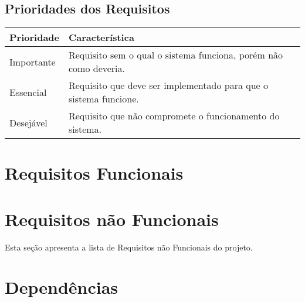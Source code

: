 \documentclass{article}
\begin{document}
	\subsection{Prioridades dos Requisitos}
	\FloatBarrier
	\begin{table}[H]
		\begin{center}
			\begin{tabular}[pos]{|m{2cm} | m{12cm}|} \hline
			\cellcolor[gray]{0.9}\textbf{Prioridade} & \cellcolor[gray]{0.9}\textbf{Característica} \\ \hline
			Importante      & Requisito sem o qual o sistema funciona, porém não como deveria.  \\ \hline
			Essencial       & Requisito que deve ser implementado para que o sistema funcione.  \\ \hline
			Desejável       & Requisito que não compromete o funcionamento do sistema.  \\ \hline
			\end{tabular}
		\end{center}
	\end{table}  
		
\section{Requisitos Funcionais}
		
			
			    
			      
	
	
			  
\section{Requisitos não Funcionais}
Esta seção apresenta a lista de Requisitos não Funcionais do projeto.
		  
	
		  
\section{Dependências}
	
	  
	
% 
% 
		  
\end{document}
